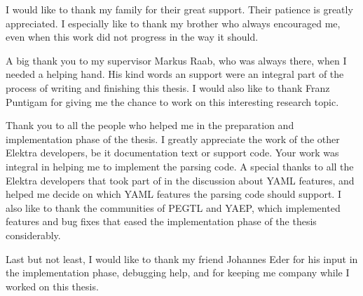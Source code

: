 \begin{acknowledgements*}
I would like to thank my family for their great support. Their patience is greatly appreciated. I especially like to thank my brother who always encouraged me, even when this work did not progress in the way it should.

A big thank you to my supervisor Markus Raab, who was always there, when I needed a helping hand. His kind words an support were an integral part of the process of writing and finishing this thesis. I would also like to thank Franz Puntigam for giving me the chance to work on this interesting research topic.

Thank you to all the people who helped me in the preparation and implementation phase of the thesis. I greatly appreciate the work of the other Elektra developers, be it documentation text or support code. Your work was integral in helping me to implement the parsing code. A special thanks to all the Elektra developers that took part of in the discussion about YAML features, and helped me decide on which YAML features the parsing code should support. I also like to thank the communities of \gls{PEGTL} and \gls{YAEP}, which implemented features and bug fixes that eased the implementation phase of the thesis considerably.

Last but not least, I would like to thank my friend Johannes Eder for his input in the implementation phase, debugging help, and for keeping me company while I worked on this thesis.
\end{acknowledgements*}
